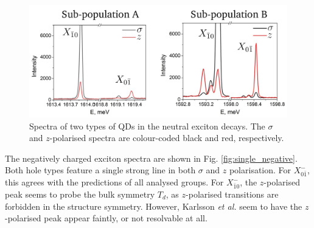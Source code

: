 \begin{figure}
\begin{center}
\includegraphics[width=\textwidth]{figures/single_neutral}
\end{center}
\caption{Spectra of two types of QDs in the neutral exciton decays. The $\sigma$ and $z$-polarised spectra are colour-coded black and red, respectively.\label{fig:single_neutral}}
\end{figure}

The negatively charged exciton spectra are shown in Fig. \ref{fig:single_negative}. Both hole types feature a single strong line in both $\sigma$ and $z$ polarisation. For $X^-_{0\bar{1}}$, this agrees with the predictions of all analysed groups. For $X^-_{\bar{1}0}$, the $z$-polarised peak seems to probe the bulk symmetry $T_d$, as $z$-polarised transitions are forbidden in the structure symmetry. However, Karlsson \textit{et al.} seem to have the $z$-polarised peak appear faintly, or not resolvable at all.
\\\hfill\\
\\\hfill\\

